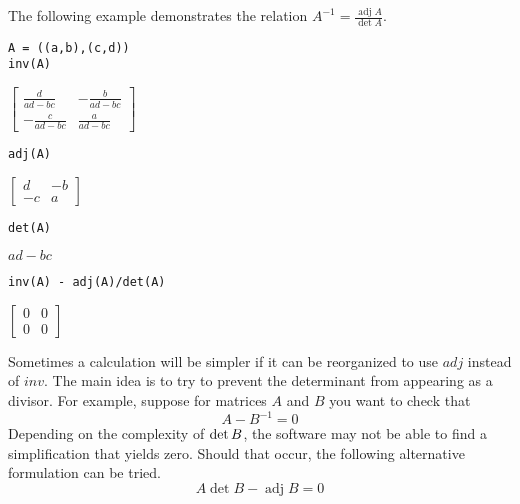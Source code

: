 \bigskip
\noindent
The following example demonstrates the relation
$A^{-1}=\frac{\operatorname{adj}A}{\operatorname{det}A}$.

{\color{blue}
\begin{verbatim}
A = ((a,b),(c,d))
inv(A)
\end{verbatim}
}

\noindent
$\begin{bmatrix}\frac{d}{ad-bc} & -\frac{b}{ad-bc}\\-\frac{c}{ad-bc} & \frac{a}{ad-bc}\end{bmatrix}$

{\color{blue}
\begin{verbatim}
adj(A)
\end{verbatim}
}

\noindent
$\begin{bmatrix}d & -b\\-c & a\end{bmatrix}$

{\color{blue}
\begin{verbatim}
det(A)
\end{verbatim}
}

\noindent
$ad-bc$

{\color{blue}
\begin{verbatim}
inv(A) - adj(A)/det(A)
\end{verbatim}
}

\noindent
$\begin{bmatrix}0 & 0\\0 & 0\end{bmatrix}$

\bigskip
\noindent
Sometimes a calculation will be simpler if it can be reorganized to use
$adj$ instead of $inv$.
The main idea is to try to prevent the determinant from appearing as a
divisor.
For example, suppose for matrices $A$ and $B$ you want to check that
\begin{equation*}
{A}-{B}^{-1}=0
\end{equation*}
Depending on the complexity of $\mathop{\rm det}B$, the software
may not be able to find a simplification that yields zero.
Should that occur, the following alternative formulation can be tried.
\begin{equation*}
A\operatorname{det}B-\operatorname{adj}B=0
\end{equation*}
